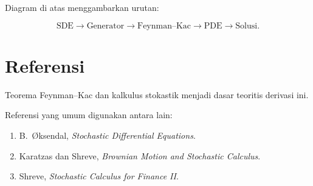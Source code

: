 \documentclass[12pt,a4paper]{article}
\begin{document}
Diagram di atas menggambarkan urutan:

\[
\text{SDE}
\rightarrow
\text{Generator}
\rightarrow
\text{Feynman--Kac}
\rightarrow
\text{PDE}
\rightarrow
\text{Solusi}.
\]

\section*{Referensi}

Teorema Feynman--Kac dan kalkulus stokastik menjadi dasar teoritis derivasi ini.

Referensi yang umum digunakan antara lain:

\begin{enumerate}

\item
B.~{\O}ksendal,
\textit{Stochastic Differential Equations}.

\item
Karatzas dan Shreve,
\textit{Brownian Motion and Stochastic Calculus}.

\item
Shreve,
\textit{Stochastic Calculus for Finance II}.

\end{enumerate}
\end{document}
